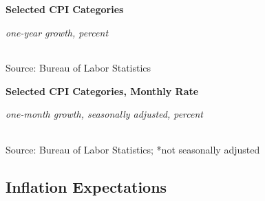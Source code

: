 \documentclass{report}
\begin{document}
{\begin{minipage}{0.76\textwidth} 
\small 
\vspace{1.5mm}

\normalsize \textbf{Selected CPI Categories}\\
\footnotesize{\textit{one-year growth, percent}\\
\hspace*{-3mm}  \setlength{\tabcolsep}{2.6pt} \color{black!90}
		{\renewcommand{\arraystretch}{1.5}
\begin{tabular}{p{42mm} R{8.0mm} R{8.0mm} R{8.0mm} R{8.0mm}
		 		 R{8.0mm} R{10.0mm} R{12.0mm}} %
			  \hline
		\end{tabular}}}
\vspace{-2mm}		
		
\footnotesize{Source: Bureau of Labor Statistics}
\end{minipage}
\newpage
\vspace*{-11mm}

\begin{minipage}{0.76\textwidth} 
\small 
\end{minipage}
\vspace{0.5mm}

\normalsize \textbf{Selected CPI Categories, Monthly Rate}\\
\footnotesize{\textit{one-month growth, seasonally adjusted, percent}\\
\hspace*{-3mm}  \setlength{\tabcolsep}{2.5pt} \color{black!90}
		{\renewcommand{\arraystretch}{1.38}
\begin{tabular}{p{39mm} R{8.2mm} R{8.2mm} R{8.2mm} R{8.2mm} R{8.2mm} R{8.2mm} 
		R{8.2mm} R{8.2mm}} %
			  \hline
		\end{tabular}}}
\vspace{-2mm}		
		
\footnotesize{Source: Bureau of Labor Statistics; *not seasonally adjusted
\newpage
\hypertarget{prie}{\label{prie}}
\vspace*{-9mm}

\begin{minipage}{0.76\textwidth}
\subsection*{Inflation Expectations}
\vspace{-1mm}


\end{minipage}}}
\end{document}
